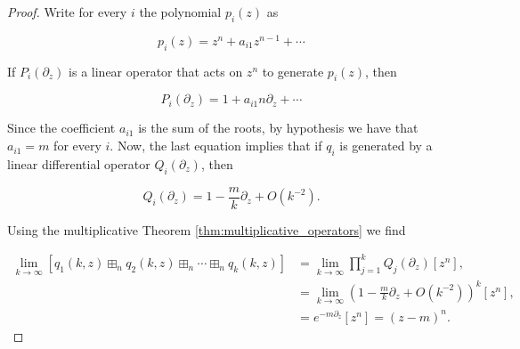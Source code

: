 \begin{proof}
    Write for every $i$ the polynomial $p_i(z)$ as

    \begin{equation*}
        p_i(z) = z^n + a_{i1} z^{n-1} + \cdots 
    \end{equation*}

    If $P_i(\partial_z)$ is a linear operator that acts on $z^n$ to generate $p_i(z)$, then 

    \begin{equation*}
        P_i(\partial_z) = 1 + a_{i1} n \partial_z + \cdots 
    \end{equation*}

    Since the coefficient $a_{i1}$ is the sum of the roots, by hypothesis we have that $a_{i1} = m$ for every $i$. Now, the last equation implies that if $q_i$ is generated by a linear differential operator $Q_i(\partial_z)$, then

    \begin{equation*}
        Q_i(\partial_z) = 1 - \frac{m}{k}\partial_z + O(k^{-2}).
    \end{equation*}

    Using the multiplicative Theorem \ref{thm:multiplicative_operators} we find

    \begin{align*}
        \lim_{k\to \infty} [ q_1(k,z) \boxplus_n q_2(k,z) \boxplus_n \cdots \boxplus_n q_k(k,z) ] &= \lim_{k\to\infty}\prod_{j=1}^k Q_j(\partial_z)[z^n],\\
        &= \lim_{k\to\infty} \left( 1 - \frac{m}{k}\partial_z + O(k^{-2}) \right)^k[z^n],\\
        &= e^{-m\partial_z}[z^n] = (z-m)^n.
    \end{align*}
\end{proof}

